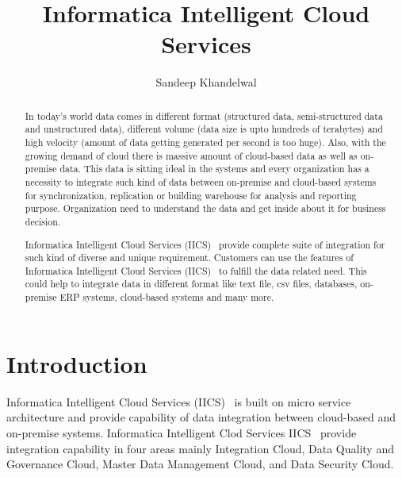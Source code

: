 
\title{Informatica Intelligent Cloud Services}

\author{Sandeep Khandelwal}

\renewcommand{\shortauthors}{S. Khandelwal}

\begin{abstract}
	
In today's world data comes in different format (structured data,
semi-structured data and unstructured data), different volume (data
size is upto hundreds of terabytes) and high velocity (amount of data
getting generated per second is too huge). Also, with the growing
demand of cloud there is massive amount of cloud-based data as well as
on-premise data. This data is sitting ideal in the systems and every
organization has a necessity to integrate such kind of data between
on-premise and cloud-based systems for synchronization, replication or
building warehouse for analysis and reporting purpose. Organization
need to understand the data and get inside about it for business
decision.

Informatica Intelligent Cloud Services (IICS)~\cite{hid-sp18-511-iics}
provide complete suite of integration for such kind of diverse and
unique requirement. Customers can use the features of Informatica
Intelligent Cloud Services (IICS)~\cite{hid-sp18-511-iics} to fulfill
the data related need. This could help to integrate data in different
format like text file, csv files, databases, on-premise ERP systems,
cloud-based systems and many more.
\end{abstract}



\maketitle


\section{Introduction}

Informatica Intelligent Cloud Services (IICS)~\cite{hid-sp18-511-iics}
is built on micro service architecture and provide capability of data
integration between cloud-based and on-premise systems. Informatica
Intelligent Clod Services IICS~\cite{hid-sp18-511-iics} provide
integration capability in four areas mainly Integration Cloud, Data
Quality and Governance Cloud, Master Data Management Cloud, and Data
Security Cloud.

